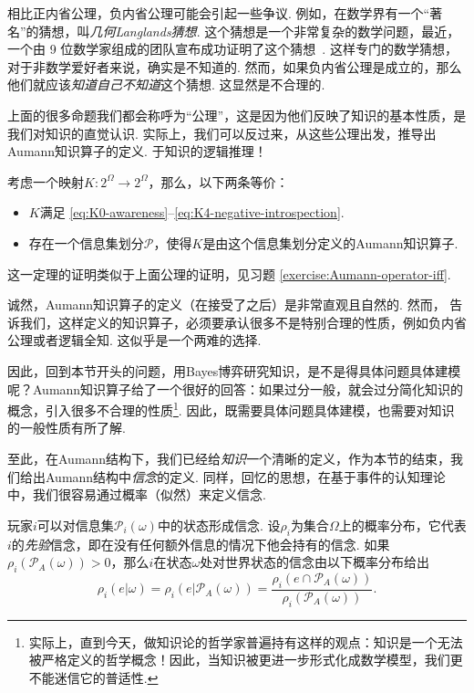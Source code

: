 相比正内省公理，负内省公理可能会引起一些争议. 例如，在数学界有一个“著名”的猜想，叫\textit{几何Langlands猜想}. 这个猜想是一个非常复杂的数学问题，最近，一个由 9 位数学家组成的团队宣布成功证明了这个猜想~\cite{ProofGeometricLanglands}. 这样专门的数学猜想，对于非数学爱好者来说，确实是不知道的. 然而，如果负内省公理是成立的，那么他们就应该\textit{知道自己不知道}这个猜想. 这显然是不合理的.

上面的很多命题我们都会称呼为“公理”，这是因为他们反映了知识的基本性质，是我们对知识的直觉认识. 实际上，我们可以反过来，从这些公理出发，推导出Aumann知识算子的定义. 
于知识的逻辑推理！

\begin{theorem}\label{thm:Aumann-operator-iff}
考虑一个映射$K:2^\Omega\to 2^\Omega$，那么，以下两条等价：
\begin{itemize}
    \item $K$满足 \eqref{eq:K0-awareness}--\eqref{eq:K4-negative-introspection}.
    \item 存在一个信息集划分$\mathcal P$，使得$K$是由这个信息集划分定义的Aumann知识算子.
\end{itemize}
\end{theorem}

这一定理的证明类似于上面公理的证明，见习题 \ref{exercise:Aumann-operator-iff}.

诚然，Aumann知识算子的定义（在接受了之后）是非常直观且自然的. 然而， 告诉我们，这样定义的知识算子，必须要承认很多不是特别合理的性质，例如负内省公理或者逻辑全知. 这似乎是一个两难的选择. 

因此，回到本节开头的问题，用Bayes博弈研究知识，是不是得具体问题具体建模呢？Aumann知识算子给了一个很好的回答：如果过分一般，就会过分简化知识的概念，引入很多不合理的性质\footnote{实际上，直到今天，做知识论的哲学家普遍持有这样的观点：知识是一个无法被严格定义的哲学概念！因此，当知识被更进一步形式化成数学模型，我们更不能迷信它的普适性.}. 因此，既需要具体问题具体建模，也需要对知识的一般性质有所了解.

至此，在Aumann结构下，我们已经给\textit{知识}一个清晰的定义，作为本节的结束，我们给出Aumann结构中\textit{信念}的定义. 同样，回忆的思想，在基于事件的认知理论中，我们很容易通过概率（似然）来定义信念. 

玩家$i$可以对信息集$\mathcal P_i(\omega)$中的状态形成信念. 设$\rho_i$为集合$\Omega$上的概率分布，它代表$i$的\textit{先验}信念，即在没有任何额外信息的情况下他会持有的信念. 如果$\rho_i(\mathcal P_A(\omega)) > 0$，那么$i$在状态$\omega$处对世界状态的信念由以下概率分布给出
\[\rho_i(e|\omega)=\rho_i(e|\mathcal P_A(\omega)) = \frac{\rho_i(e\cap\mathcal P_A(\omega))}{\rho_i(\mathcal P_A(\omega))}.\]

